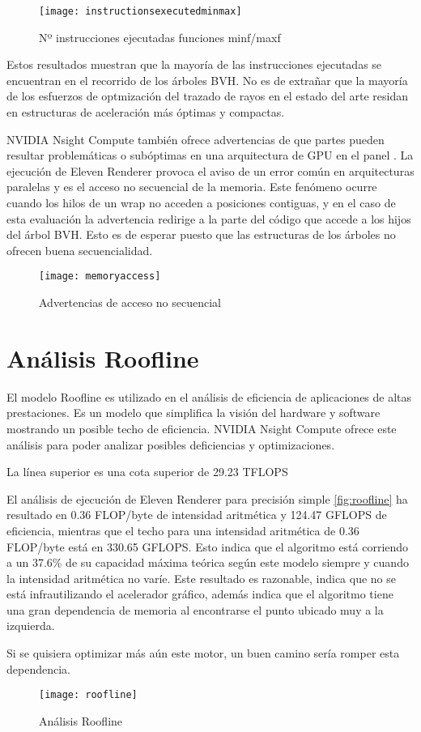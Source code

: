 \begin{figure}[H]
    \centering
	\texttt{[image: instructionsexecutedminmax]}
	\caption{Nº instrucciones ejecutadas funciones minf/maxf}
	\label{fig:label}
\end{figure}

Estos resultados muestran que la mayoría de las instrucciones ejecutadas se encuentran en el recorrido de los árboles BVH. No es de extrañar que la mayoría de los esfuerzos de optmización del trazado de rayos en el estado del arte residan en estructuras de aceleración más óptimas y compactas. 

NVIDIA Nsight Compute también ofrece advertencias de que partes pueden resultar problemáticas o subóptimas en una arquitectura de GPU en el panel . La ejecución de Eleven Renderer provoca el aviso de un error común en arquitecturas paralelas y es el acceso no secuencial de la memoria. Este fenómeno ocurre cuando los hilos de un wrap no acceden a posiciones contiguas, y en el caso de esta evaluación la advertencia redirige a la parte del código que accede a los hijos del árbol BVH. Esto es de esperar puesto que las estructuras de los árboles no ofrecen buena secuencialidad.

\begin{figure}[H]
    \centering
	\texttt{[image: memoryaccess]}
	\caption{Advertencias de acceso no secuencial}
	\label{fig:label}
\end{figure}



\section{Análisis Roofline}
	
El modelo Roofline es utilizado en el análisis de eficiencia de aplicaciones de altas prestaciones. Es un modelo que simplifica la visión del hardware y software mostrando un posible techo de eficiencia. NVIDIA Nsight Compute ofrece este análisis para poder analizar posibles deficiencias y optimizaciones.

La línea superior es una cota superior de 29.23 TFLOPS

El análisis de ejecución de Eleven Renderer para precisión simple \autoref{fig:roofline} ha resultado en 0.36 FLOP/byte de intensidad aritmética y 124.47 GFLOPS de eficiencia, mientras que el techo para una intensidad aritmética de 0.36 FLOP/byte está en 330.65 GFLOPS. Esto indica que el algoritmo está corriendo a un 37.6\% de su capacidad máxima teórica según este modelo siempre y cuando la intensidad aritmética no varíe. Este resultado es razonable, indica que no se está infrautilizando el acelerador gráfico, además indica que el algoritmo tiene una gran dependencia de memoria al encontrarse el punto ubicado muy a la izquierda.

Si se quisiera optimizar más aún este motor, un buen camino sería romper esta dependencia.

\begin{figure}[H]
    \centering
	\texttt{[image: roofline]}
	\caption{Análisis Roofline}
	\label{fig:roofline}
\end{figure}


